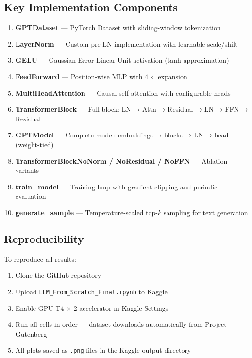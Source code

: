 \documentclass[12pt,a4paper]{article}
\begin{document}
\subsection{Key Implementation Components}

\begin{enumerate}[leftmargin=2cm]
  \item \textbf{GPTDataset} — PyTorch Dataset with sliding-window tokenization
  \item \textbf{LayerNorm} — Custom pre-LN implementation with learnable scale/shift
  \item \textbf{GELU} — Gaussian Error Linear Unit activation (tanh approximation)
  \item \textbf{FeedForward} — Position-wise MLP with $4\times$ expansion
  \item \textbf{MultiHeadAttention} — Causal self-attention with configurable heads
  \item \textbf{TransformerBlock} — Full block: LN → Attn → Residual → LN → FFN → Residual
  \item \textbf{GPTModel} — Complete model: embeddings → blocks → LN → head (weight-tied)
  \item \textbf{TransformerBlockNoNorm / NoResidual / NoFFN} — Ablation variants
  \item \textbf{train\_model} — Training loop with gradient clipping and periodic evaluation
  \item \textbf{generate\_sample} — Temperature-scaled top-$k$ sampling for text generation
\end{enumerate}

\subsection{Reproducibility}

To reproduce all results:

\begin{enumerate}[leftmargin=2cm]
  \item Clone the GitHub repository
  \item Upload \texttt{LLM\_From\_Scratch\_Final.ipynb} to Kaggle
  \item Enable GPU T4 $\times$ 2 accelerator in Kaggle Settings
  \item Run all cells in order — dataset downloads automatically from Project Gutenberg
  \item All plots saved as \texttt{.png} files in the Kaggle output directory
\end{enumerate}
\end{document}
